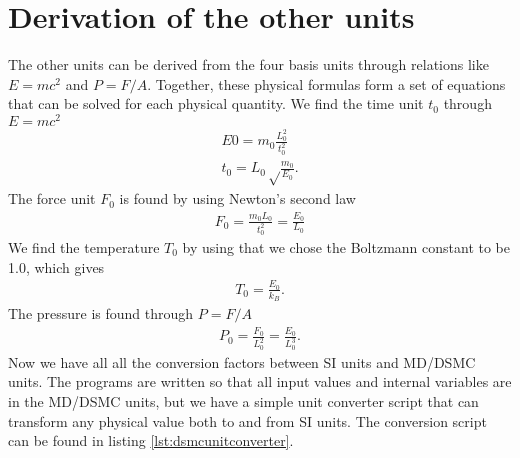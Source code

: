 \section{Derivation of the other units}
The other units can be derived from the four basis units through relations like $E=mc^2$ and $P=F/A$. Together, these physical formulas form a set of equations that can be solved for each physical quantity. We find the time unit $t_0$ through $E=mc^2$
\begin{align}
	E0 = m_0\frac{L_0^2}{t_0^2}\\
	t_0 = L_0\sqrt\frac{m_0}{E_0}.
\end{align}
The force unit $F_0$ is found by using Newton's second law
\begin{align}
	F_0 = \frac{m_0L_0}{t_0^2} = \frac{E_0}{L_0}
\end{align}
We find the temperature $T_0$ by using that we chose the Boltzmann constant to be 1.0, which gives
\begin{align}
	T_0 = \frac{E_0}{k_B}.
\end{align}
The pressure is found through $P=F/A$ 
\begin{align}
	P_0 = \frac{F_0}{L_0^2} = \frac{E_0}{L_0^3}.
\end{align}
Now we have all all the conversion factors between SI units and MD/DSMC units. The programs are written so that all input values and internal variables are in the MD/DSMC units, but we have a simple unit converter script that can transform any physical value both to and from SI units. The conversion script can be found in listing \ref{lst:dsmcunitconverter}.

